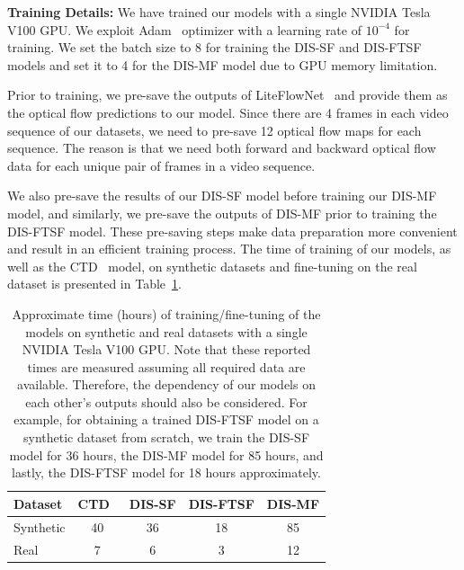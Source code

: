 \bigbreak\noindent\textbf{Training Details:} We have trained our models with a single NVIDIA Tesla V100 GPU. We exploit Adam~\citep{adam} optimizer with a learning rate of $10^{-4}$ for training. We set the batch size to 8 for training the DIS-SF and DIS-FTSF models and set it to 4 for the DIS-MF model due to GPU memory limitation.

Prior to training, we pre-save the outputs of LiteFlowNet~\citep{hui2018liteflownet} and provide them as the optical flow predictions to our model. Since there are 4 frames in each video sequence of our datasets, we need to pre-save 12 optical flow maps for each sequence. The reason is that we need both forward and backward optical flow data for each unique pair of frames in a video sequence.

We also pre-save the results of our DIS-SF model before training our DIS-MF model, and similarly, we pre-save the outputs of DIS-MF prior to training the DIS-FTSF model. These pre-saving steps make data preparation more convenient and result in an efficient training process. The time of training of our models, as well as the CTD~\citep{riegler2019connecting} model, on synthetic datasets and fine-tuning on the real dataset is presented in Table~\ref{table:train_time_supp}.

\begin{table}[t]
    \begin{center}
        \begin{tabular}{lcccc}
        \hline
        Dataset & CTD~\citep{riegler2019connecting} & DIS-SF & DIS-FTSF & DIS-MF \\
        \hline
        Synthetic & 40 & 36 & 18 & 85 \\
        Real & 7 & 6 & 3 & 12\\
        \hline
        \end{tabular}
    \end{center}
    \caption{Approximate time (hours) of training/fine-tuning of the models on synthetic and real datasets with a single NVIDIA Tesla V100 GPU. Note that these reported times are measured assuming all required data are available. Therefore, the dependency of our models on each other's outputs should also be considered. For example, for obtaining a trained DIS-FTSF model on a synthetic dataset from scratch, we train the DIS-SF model for 36 hours, the DIS-MF model for 85 hours, and lastly, the DIS-FTSF model for 18 hours approximately.}
    \label{table:train_time_supp}
\end{table}

